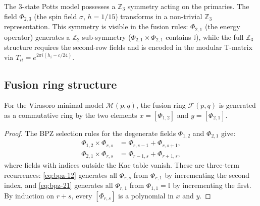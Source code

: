 \begin{remark}\label{rem:z3-symmetry-65}
The $3$-state Potts model possesses a $\mathbb{Z}_3$ symmetry acting on the
primaries.  The field $\Phi_{2,3}$ (the spin field $\sigma$, $h = 1/15$) transforms
in a non-trivial $\mathbb{Z}_3$ representation.  This symmetry is visible
in the fusion rules: $\Phi_{2,1}$ (the energy operator) generates a
$\mathbb{Z}_2$ sub-symmetry ($\Phi_{2,1}\times\Phi_{2,1}$ contains $\mathbb{I}$),
while the full $\mathbb{Z}_3$ structure requires the second-row fields and
is encoded in the modular T-matrix via $T_{ii} = e^{2\pi i(h_i - c/24)}$.
\end{remark}

\subsection{Fusion ring structure}
\label{subsec:fusion-ring-structure}

\begin{theorem}\label{thm:fusion-ring-generators}
For the Virasoro minimal model $\mathcal{M}(p,q)$, the fusion ring $\mathcal{F}(p,q)$
is generated as a commutative ring by the two elements
$x = [\Phi_{1,2}]$ and $y = [\Phi_{2,1}]$.
\end{theorem}

\begin{proof}
The BPZ selection rules for the degenerate fields $\Phi_{1,2}$ and $\Phi_{2,1}$ give:
\begin{align}
\Phi_{1,2} \times \Phi_{r,s} &= \Phi_{r,s-1} + \Phi_{r,s+1}, \label{eq:bpz-12}\\
\Phi_{2,1} \times \Phi_{r,s} &= \Phi_{r-1,s} + \Phi_{r+1,s}, \label{eq:bpz-21}
\end{align}
where fields with indices outside the Kac table vanish.  These are
three-term recurrences: \eqref{eq:bpz-12} generates all $\Phi_{r,s}$
from $\Phi_{r,1}$ by incrementing the second index, and \eqref{eq:bpz-21}
generates all $\Phi_{r,1}$ from $\Phi_{1,1} = \mathbb{I}$ by incrementing
the first.  By induction on $r + s$, every $[\Phi_{r,s}]$ is a polynomial
in $x$ and $y$.
\end{proof}

